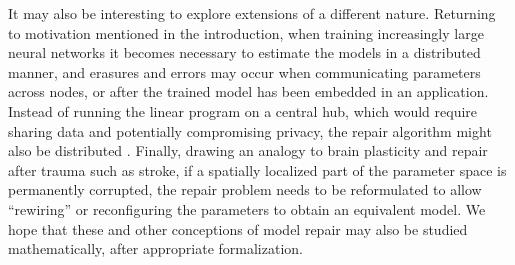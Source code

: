 It may also be interesting to explore extensions of a different nature.
Returning to motivation mentioned in the introduction, when training increasingly large neural networks
it becomes necessary to estimate the models in a distributed manner, and erasures and errors may occur when
communicating parameters across nodes, or after the trained model has been embedded in an application.
Instead of running the linear program on a central hub,
which would require sharing data and potentially compromising privacy, the repair algorithm
might also be distributed \citep{hong12}. Finally, drawing an analogy to brain plasticity and repair after trauma such as stroke, if a spatially localized part of the parameter space is permanently corrupted, the repair problem needs to be reformulated to allow ``rewiring'' or reconfiguring the parameters to obtain an equivalent model. We hope that these and other conceptions of model repair may also be studied mathematically, after appropriate formalization.
